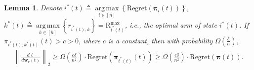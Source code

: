 \documentclass[10pt]{article}
\def\rvw{{\mathbf{w}}}
\def\r{{\text{R}}}
\def\regret{{\text{Regret}}}
\newtheorem{lem}{Lemma}
\def\rvpi{{\boldsymbol{\pi}}}
\DeclareMathOperator*{\argmax}{arg\,max}
\begin{document}
\begin{lem}
\label{lem:gradient_lower_bound}
	Denote $i^*(t) \triangleq \argmax\limits_{i \in [n]}\left\{\regret(\rvpi_i(t))\right\}$, $k^*(t) \triangleq \argmax\limits_{k \in [h]}\left\{ r_{i^*(t),k} \right\} = \r_{i^*(t)}^{\max}$, i.e., the optimal arm of state $i^*(t)$. If $\pi_{i^*(t), k^*(t)}(t) > c > 0$, where $c$ is a constant, then with probability $\Omega\left( \frac{\delta}{n} \right)$,
\begin{equation*}
\begin{split}
	\left\| \frac{d\tilde{\ell}}{d \rvw_r(t)} \right\|_2 \ge \Omega\left( \frac{c\delta}{n^2} \right) \cdot \regret\left( \rvpi_{i^*(t)}(t) \right) \ge \Omega\left( \frac{c\delta}{n^2} \right) \cdot \regret\left( \rvpi(t) \right).
\end{split}
\end{equation*}
\end{lem}
\end{document}
